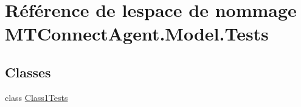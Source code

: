 \hypertarget{namespace_m_t_connect_agent_1_1_model_1_1_tests}{}\section{Référence de l\textquotesingle{}espace de nommage M\+T\+Connect\+Agent.\+Model.\+Tests}
\label{namespace_m_t_connect_agent_1_1_model_1_1_tests}
\subsection*{Classes}
\begin{DoxyCompactItemize}
\item 
class \mbox{\hyperlink{class_m_t_connect_agent_1_1_model_1_1_tests_1_1_class1_tests}{Class1\+Tests}}
\end{DoxyCompactItemize}
